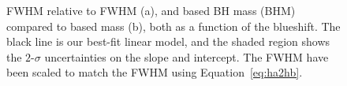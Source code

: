 \begin{figure}
    \captionsetup[subfigure]{labelformat=empty} 
    \centering
    \subfloat[\label{fig:correction_ha_a}]{}
    \subfloat[\label{fig:correction_ha_b}]{}
    \caption[{ FWHM relative to \ha FWHM and  based BH mass compared to \ha based mass, both as a function of the  blueshift.}]{ FWHM relative to \ha FWHM (a), and  based BH mass (BHM) compared to \ha based mass (b), both as a function of the  blueshift. The black line is our best-fit linear model, and the shaded region shows the $2$-$\sigma$ uncertainties on the slope and intercept. The \ha FWHM have been scaled to match the \hb FWHM using Equation~\ref{eq:ha2hb}.}  
    \label{fig:correction_ha}
\end{figure}

